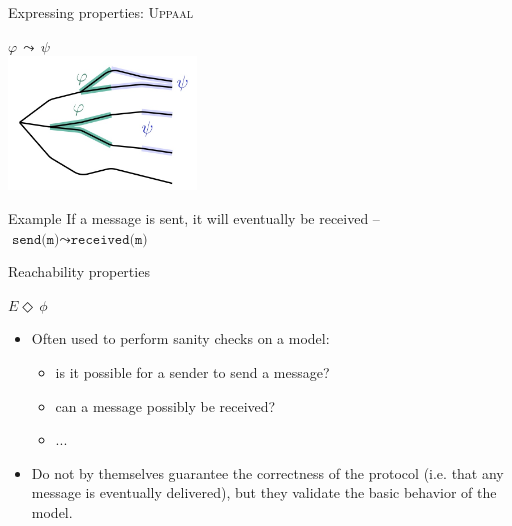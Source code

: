 \documentclass[aspectratio=169]{beamer}
\begin{document}
\begin{slide}{Expressing properties: \textsc{Uppaal}}
\small \centering

\begin{center}
  \Large $\varphi\, \leadsto\, \psi$ \\
 \includegraphics[width=5cm]{./images/LeadsTo.jpg} 
 \end{center}

\begin{exampleblock}{Example}
  If a message is sent, it will eventually be received -- $\texttt{send(m)} \leadsto \texttt{received(m)}$
\end{exampleblock}

\end{slide}

\begin{slide}{Reachability properties}
\small

\begin{block}{$E \Diamond\, \phi$}

\begin{itemize}
\item  Often used to perform sanity checks  on a model:
\begin{itemize}
\item \alert{is it possible for a sender to send a message?}
 \item \alert{can a message possibly be received?}
 \item ...
 \end{itemize}
 \item  Do not by themselves guarantee the correctness of the protocol (i.e. \alert{that any message is eventually delivered}), 
but they validate the basic behavior of the model.
 \end{itemize}
\end{block}

\end{slide}
\end{document}
